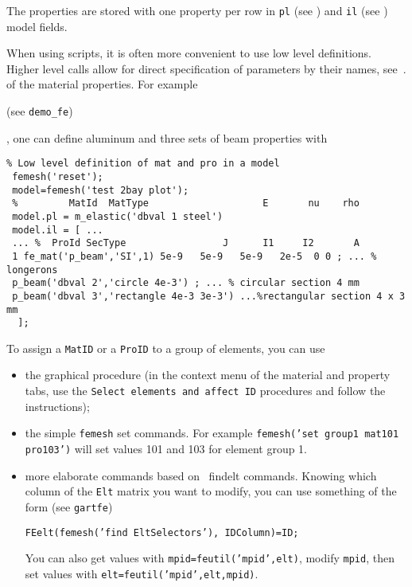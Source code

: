 The properties are stored with one property per row in {\tt pl} (see ) and {\tt il} (see ) model fields. 

When using scripts, it is often more convenient to use low level definitions. Higher level calls allow for direct specification of parameters by their names, see~.
of the material properties. For example \begin{SDT} (see {\tt demo\_fe}) \end{SDT}, one can define aluminum and three sets of beam properties with 

\begin{verbatim}
% Low level definition of mat and pro in a model
 femesh('reset');
 model=femesh('test 2bay plot');
 %         MatId  MatType                    E       nu    rho
 model.pl = m_elastic('dbval 1 steel')
 model.il = [ ...
 ... %  ProId SecType                 J      I1     I2       A
 1 fe_mat('p_beam','SI',1) 5e-9   5e-9   5e-9   2e-5  0 0 ; ... % longerons
 p_beam('dbval 2','circle 4e-3') ; ... % circular section 4 mm
 p_beam('dbval 3','rectangle 4e-3 3e-3') ...%rectangular section 4 x 3 mm
  ];
\end{verbatim}%


To assign a {\tt MatID} or a {\tt ProID} to a group of elements, you can use 

\begin{itemize}
\item the graphical procedure (in the context menu of the material and property tabs, use the {\tt Select elements and affect ID} procedures and follow the instructions);
\item the simple {\tt femesh} set commands. For example {\tt femesh('set group1 mat101 pro103')} will set values 101 and 103 for element group 1.

\item more elaborate commands based on \femesh\ findelt commands. Knowing which column of the {\tt Elt} matrix you want to modify, you can use something of the form (see {\tt gartfe})

{\tt FEelt(femesh('find {\ti EltSelectors}'), {\ti IDColumn})={\ti ID};}

You can also get values with {\tt mpid=feutil('mpid',elt)}, modify {\tt mpid}, then set values with {\tt elt=feutil('mpid',elt,mpid)}.

\end{itemize}


